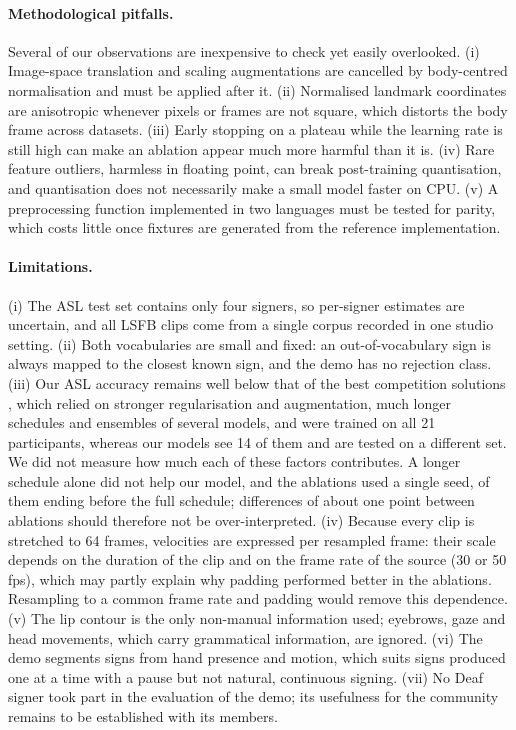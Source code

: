 \paragraph{Methodological pitfalls.}
Several of our observations are inexpensive to check yet easily overlooked. (i) Image-space
translation and scaling augmentations are cancelled by body-centred normalisation and must be
applied after it. (ii) Normalised landmark coordinates are anisotropic whenever pixels or frames
are not square, which distorts the body frame across datasets. (iii) Early stopping on a plateau
while the learning rate is still high can make an ablation appear much more harmful than it is.
(iv) Rare feature outliers, harmless in floating point, can break post-training quantisation, and
quantisation does not necessarily make a small model faster on CPU. (v) A preprocessing function
implemented in two languages must be tested for parity, which costs little once fixtures are
generated from the reference implementation.

\paragraph{Limitations.}
(i) The ASL test set contains only four signers, so per-signer estimates are uncertain, and all
LSFB clips come from a single corpus recorded in one studio setting. (ii) Both vocabularies are
small and fixed: an out-of-vocabulary sign is always mapped to the closest known sign, and the demo
has no rejection class. (iii) Our ASL accuracy remains well below that of the best competition
solutions \citep{kaggle_islr}, which relied on stronger regularisation and augmentation, much
longer schedules and ensembles of several models, and were trained on all 21 participants, whereas
our models see 14 of them and are tested on a different set. We did not measure how much each of
these factors contributes. A longer schedule alone did not help our model, and the ablations used a
single seed, \numAblEarlyStopped{} of them ending before the full schedule; differences of about one
point between ablations should therefore not be over-interpreted. (iv) Because every clip is
stretched to 64 frames, velocities are expressed per resampled frame: their scale depends on the
duration of the clip and on the frame rate of the source (30 or 50\,fps), which may partly explain
why padding performed better in the ablations. Resampling to a common frame rate and padding would
remove this dependence. (v) The lip contour is the only non-manual information used; eyebrows, gaze and head
movements, which carry grammatical information, are ignored. (vi) The demo segments signs from hand
presence and motion, which suits signs produced one at a time with a pause but not natural,
continuous signing. (vii) No Deaf signer took part in the evaluation of the demo; its usefulness
for the community remains to be established with its members.

